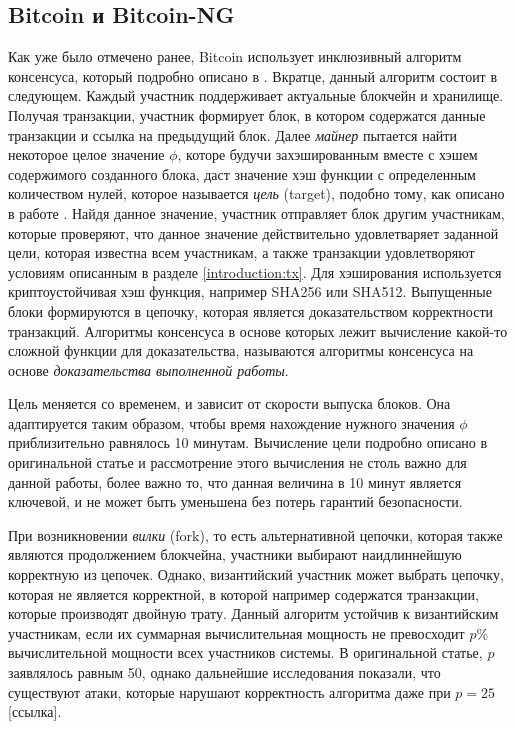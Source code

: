 \subsection{Bitcoin и Bitcoin-NG}
Как уже было отмечено ранее, Bitcoin использует инклюзивный алгоритм консенсуса, который подробно описано в \cite{nakamoto}. Вкратце, данный алгоритм состоит в следующем.
Каждый участник поддерживает актуальные блокчейн и хранилище. Получая транзакции, участник формирует блок, в котором содержатся данные транзакции и ссылка на предыдущий блок. Далее \textit{майнер} пытается найти некоторое целое значение $\phi$, которе будучи захэшированным вместе с хэшем содержимого созданного блока, даст значение хэш функции с определенным количеством нулей, которое называется \textit{цель} (target), подобно тому, как описано в работе \cite{hashcash}. Найдя данное значение, участник отправляет блок другим участникам, которые проверяют, что данное значение действительно удовлетваряет заданной цели, которая известна всем участникам, а также транзакции удовлетворяют условиям описанным в разделе \ref{introduction:tx}. Для хэширования используется криптоустойчивая хэш функция, например SHA256 или SHA512.
Выпущенные блоки формируются в цепочку, которая является доказательством корректности транзакций. Алгоритмы консенсуса в основе которых лежит вычисление какой-то сложной функции для доказательства, называются  алгоритмы консенсуса на основе \textit{доказательства выполненной работы}\cite{pow}.

Цель меняется со временем, и зависит от скорости выпуска блоков. Она адаптируется таким образом, чтобы время нахождение нужного значения $\phi$  приблизительно равнялось 10 минутам. Вычисление цели подробно описано в оригинальной статье \cite{nakamoto} и рассмотрение этого вычисления не столь важно для данной работы, более важно то, что данная величина в 10 минут является ключевой, и не может быть уменьшена без потерь гарантий безопасности.

При возникновении \textit{вилки} (fork), то есть альтернативной цепочки, которая также являются продолжением блокчейна, участники выбирают наидлиннейшую корректную из цепочек. Однако, византийский участник может выбрать цепочку, которая не является корректной, в которой например содержатся транзакции, которые производят двойную трату. Данный алгоритм устойчив к византийским участникам, если их суммарная вычислительная мощность не превосходит $p$\% вычислительной мощности всех участников системы. В оригинальной статье, $p$ заявлялось равным 50, однако дальнейшие исследования показали, что существуют атаки, которые нарушают корректность алгоритма даже при $p=25$[ссылка].

